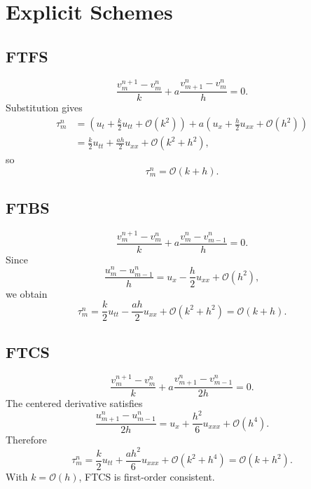 \documentclass[11pt]{article}
\newcommand{\Oh}{\mathcal{O}}
\begin{document}
\section{Explicit Schemes}

\subsection{FTFS}

\begin{equation}
    \frac{v_m^{n+1}-v_m^n}{k}
    +a\frac{v_{m+1}^n-v_m^n}{h}=0.
\end{equation}
Substitution gives
\begin{align}
    \tau_m^n
    &=
    \left(u_t+\frac{k}{2}u_{tt}+\Oh(k^2)\right)
    +a\left(u_x+\frac{h}{2}u_{xx}+\Oh(h^2)\right)\\
    &=
    \frac{k}{2}u_{tt}+\frac{ah}{2}u_{xx}
    +\Oh(k^2+h^2),
\end{align}
so
\begin{equation}
    \tau_m^n=\Oh(k+h).
\end{equation}

\subsection{FTBS}

\begin{equation}
    \frac{v_m^{n+1}-v_m^n}{k}
    +a\frac{v_m^n-v_{m-1}^n}{h}=0.
\end{equation}
Since
\begin{equation}
    \frac{u_m^n-u_{m-1}^n}{h}
    =
    u_x-\frac{h}{2}u_{xx}+\Oh(h^2),
\end{equation}
we obtain
\begin{equation}
    \tau_m^n
    =
    \frac{k}{2}u_{tt}
    -\frac{ah}{2}u_{xx}
    +\Oh(k^2+h^2)
    =
    \Oh(k+h).
\end{equation}

\subsection{FTCS}

\begin{equation}
    \frac{v_m^{n+1}-v_m^n}{k}
    +a\frac{v_{m+1}^n-v_{m-1}^n}{2h}=0.
\end{equation}
The centered derivative satisfies
\begin{equation}
    \frac{u_{m+1}^n-u_{m-1}^n}{2h}
    =
    u_x+\frac{h^2}{6}u_{xxx}+\Oh(h^4).
\end{equation}
Therefore
\begin{equation}
    \tau_m^n
    =
    \frac{k}{2}u_{tt}
    +\frac{a h^2}{6}u_{xxx}
    +\Oh(k^2+h^4)
    =
    \Oh(k+h^2).
\end{equation}
With $k=\Oh(h)$, FTCS is first-order consistent.
\end{document}
